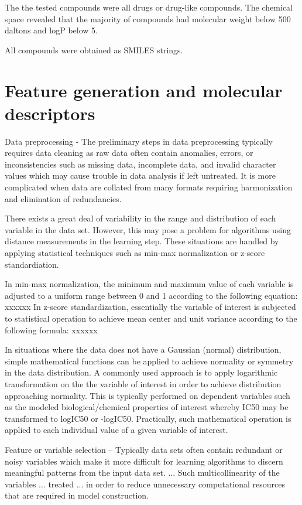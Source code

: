 The the tested compounds were all drugs or drug-like compounds. The chemical space revealed that the majority of compounds had molecular weight below 500 daltons and logP below 5. \cite{Lapins2013}

All compounds were obtained as SMILES strings.


\section{Feature generation and molecular descriptors}

Data preprocessing - The preliminary steps in data preprocessing typically requires data cleaning as raw data often contain anomalies, errors, or inconsistencies such as missing data, incomplete data, and invalid character values which may cause trouble in data analysis if left untreated. It is more complicated when data are collated from many formats requiring harmonization and elimination of redundancies.\cite{Nantasenamat2009}

There exists a great deal of variability in the range and distribution of each variable in the data set. However, this may pose a problem for algorithms using distance measurements in the learning step. These situations are handled by applying statistical techniques such as min-max normalization or z-score standardiation. 

In min-max normalization, the minimum and maximum value of each variable is adjusted to a uniform range between 0 and 1 according to the following equation: xxxxxx In z-score standardization, essentially the variable of interest is subjected to statistical operation to achieve mean center and unit variance according to the following formula: xxxxxx \cite{Nantasenamat2009}

In situations where the data does not have a Gaussian (normal) distribution, simple mathematical functions can be applied to achieve normality or symmetry in the data distribution. A commonly used approach is to apply logarithmic transformation on the the variable of interest in order to achieve distribution approaching normality. This is typically performed on dependent variables such as the modeled biological/chemical properties of interest whereby IC50 may be transformed to logIC50 or -logIC50. Practically, such mathematical operation is applied to each individual value of a given variable of interest. \cite{Nantasenamat2009}

Feature or variable selection -- Typically data sets often contain redundant or noisy variables which make it more difficult for learning algorithms to discern meaningful patterns from the input data set. ... Such multicollinearity of the variables ... treated ... in order to reduce unnecessary computational resources that are required in model construction. \cite{Nantasenamat2009}

